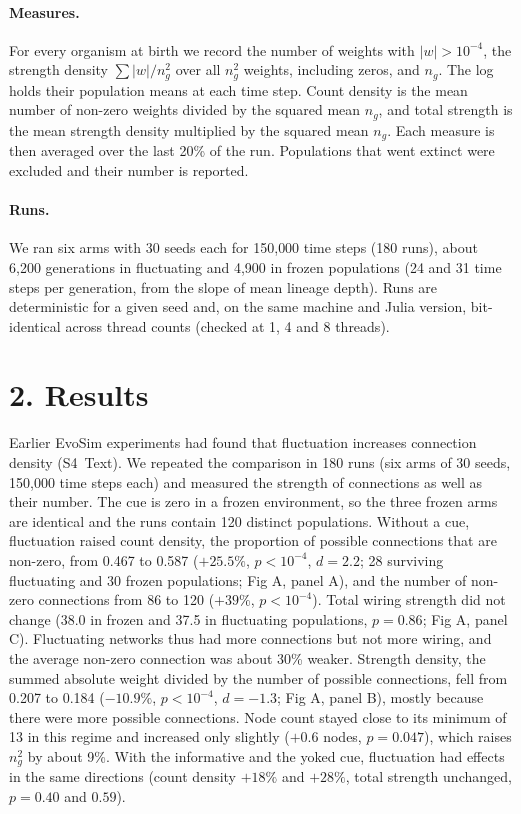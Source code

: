 \paragraph*{Measures.} For every organism at birth we record the number of
weights with $|w|>10^{-4}$, the strength density $\sum|w|/n_g^2$ over all $n_g^2$
weights, including zeros, and $n_g$. The log holds their population means at
each time step. Count density is the mean number of non-zero weights divided by
the squared mean $n_g$, and total strength is the mean strength density
multiplied by the squared mean $n_g$. Each measure is then averaged over the
last 20\% of the run. Populations
that went extinct were excluded and their number is reported.

\paragraph*{Runs.} We ran six arms with 30 seeds each for 150{,}000 time steps
(180 runs), about 6{,}200 generations in fluctuating and 4{,}900 in frozen
populations (24 and 31 time steps per generation, from the slope of mean lineage
depth). Runs are deterministic for a given seed and, on the same machine
and Julia version, bit-identical across thread counts (checked at 1, 4 and 8
threads).

\section*{2. Results}
Earlier EvoSim experiments had found that fluctuation increases connection
density (S4~Text). We repeated the comparison in 180 runs (six arms of 30 seeds,
150{,}000 time steps each) and measured the strength of connections as
well as their number. The cue is zero in a frozen environment, so the three frozen arms are
identical and the runs contain 120 distinct populations. Without a cue,
fluctuation raised count density, the
proportion of possible connections that are non-zero, from 0.467 to 0.587
($+25.5\%$, $p<10^{-4}$, $d=2.2$; 28 surviving fluctuating and 30 frozen
populations; Fig A, panel A), and the number of non-zero connections from 86
to 120 ($+39\%$, $p<10^{-4}$). Total wiring strength did not change (38.0 in
frozen and 37.5 in fluctuating populations, $p=0.86$; Fig A, panel C).
Fluctuating networks thus had more connections but not more wiring, and the
average non-zero connection was about 30\% weaker. Strength density, the summed
absolute weight divided by the number of possible connections, fell from 0.207
to 0.184 ($-10.9\%$, $p<10^{-4}$, $d=-1.3$; Fig A, panel B), mostly because
there were more possible connections. Node count stayed close to its minimum of
13 in this regime and increased only slightly ($+0.6$ nodes, $p=0.047$), which
raises $n_g^2$ by about 9\%. With the informative and the yoked cue, fluctuation
had effects in the same directions (count density $+18\%$ and $+28\%$, total
strength unchanged, $p=0.40$ and $0.59$).

